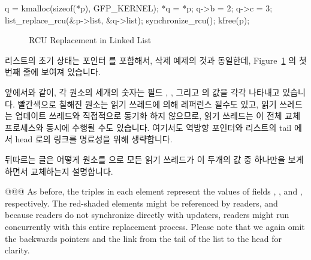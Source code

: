
\begin{linelabel}
\begin{VerbatimN}[samepage=true,commandchars=\\\[\],firstnumber=15]
q = kmalloc(sizeof(*p), GFP_KERNEL);	\lnlbl[kmalloc]
*q = *p;				\lnlbl[copy]
q->b = 2;				\lnlbl[update1]
q->c = 3;				\lnlbl[update2]
list_replace_rcu(&p->list, &q->list);	\lnlbl[replace]
synchronize_rcu();			
kfree(p);				\lnlbl[kfree]
\end{VerbatimN}
\end{linelabel}

\begin{figure}[tbp]
\centering
{}
\caption{RCU Replacement in Linked List}
\label{fig:defer:RCU Replacement in Linked List}
\end{figure}

리스트의 초기 상태는 포인터  를 포함해서, 삭제 예제의 것과 동일한데,
Figure~\ref{fig:defer:RCU Replacement in Linked List} 의 첫번째 줄에 보여져
있습니다.

앞에서와 같이, 각 원소의 세개의 숫자는 필드 , , 그리고  의
값을 각각 나타내고 있습니다.
빨간색으로 칠해진 원소는 읽기 쓰레드에 의해 레퍼런스 될수도 있고, 읽기 쓰레드는
업데이트 쓰레드와 직접적으로 동기화 하지 않으므로, 읽기 쓰레드는 이 전체 교체
프로세스와 동시에 수행될 수도 있습니다.
여기서도 역방향 포인터와 리스트의 tail 에서 head 로의 링크를 명료성을 위해
생략합니다.

뒤따르는 글은 어떻게  원소를  으로 모든 읽기 쓰레드가 이
두개의 값 중 하나만을 보게 하면서 교체하는지 설명합니다.
\iffalse

@@@ As before,
the triples in each element represent the values of fields ,
, and , respectively.
The red-shaded elements might be referenced by readers,
and because readers do not synchronize directly with updaters,
readers might run concurrently with this entire replacement process.
Please note that
we again omit the backwards pointers and the link from the tail
of the list to the head for clarity.

